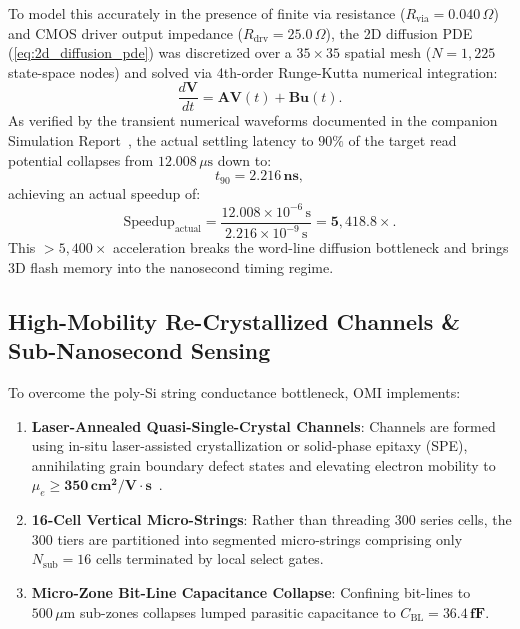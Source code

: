 \documentclass[journal]{IEEEtran}
\begin{document}
To model this accurately in the presence of finite via resistance ($R_{\text{via}} = 0.040\,\Omega$) and CMOS driver output impedance ($R_{\text{drv}} = 25.0\,\Omega$), the 2D diffusion PDE (\ref{eq:2d_diffusion_pde}) was discretized over a $35 \times 35$ spatial mesh ($N = 1,225$ state-space nodes) and solved via 4th-order Runge-Kutta numerical integration:
\begin{equation}
    \frac{d \mathbf{V}}{dt} = \mathbf{A} \mathbf{V}(t) + \mathbf{B} \mathbf{u}(t).
\end{equation}
As verified by the transient numerical waveforms documented in the companion Simulation Report~\cite{omi_sim_report}, the actual settling latency to $90\%$ of the target read potential collapses from $12.008\,\mu\text{s}$ down to:
\begin{equation}
    t_{90} = \mathbf{2.216\,\text{ns}},
\end{equation}
achieving an actual speedup of:
\begin{equation}
    \text{Speedup}_{\text{actual}} = \frac{12.008 \times 10^{-6}\,\text{s}}{2.216 \times 10^{-9}\,\text{s}} = \mathbf{5,418.8\times}.
\end{equation}
This $>5,400\times$ acceleration breaks the word-line diffusion bottleneck and brings 3D flash memory into the nanosecond timing regime.

\subsection{High-Mobility Re-Crystallized Channels \& Sub-Nanosecond Sensing}
To overcome the poly-Si string conductance bottleneck, OMI implements:
\begin{enumerate}
    \item \textbf{Laser-Annealed Quasi-Single-Crystal Channels}: Channels are formed using in-situ laser-assisted crystallization or solid-phase epitaxy (SPE), annihilating grain boundary defect states and elevating electron mobility to $\mu_e \ge \mathbf{350\,\text{cm}^2/\text{V}\cdot\text{s}}$~\cite{ishida2022high}.
    \item \textbf{16-Cell Vertical Micro-Strings}: Rather than threading 300 series cells, the 300 tiers are partitioned into segmented micro-strings comprising only $N_{\text{sub}} = 16$ cells terminated by local select gates.
    \item \textbf{Micro-Zone Bit-Line Capacitance Collapse}: Confining bit-lines to $500\,\mu\text{m}$ sub-zones collapses lumped parasitic capacitance to $C_{\text{BL}} = \mathbf{36.4\,\text{fF}}$.
\end{enumerate}
\end{document}
